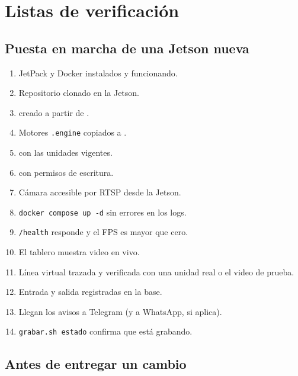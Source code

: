 \chapter{Listas de verificación}
\label{cap:checklist}

\section{Puesta en marcha de una Jetson nueva}

\begin{enumerate}
  \item[$\square$] JetPack y Docker instalados y funcionando.
  \item[$\square$] Repositorio clonado en la Jetson.
  \item[$\square$]  creado a partir de .
  \item[$\square$] Motores \texttt{.engine} copiados a .
  \item[$\square$]  con las unidades vigentes.
  \item[$\square$]  con permisos de escritura.
  \item[$\square$] Cámara accesible por RTSP desde la Jetson.
  \item[$\square$] \texttt{docker compose up -d} sin errores en los logs.
  \item[$\square$] \texttt{/health} responde y el FPS es mayor que cero.
  \item[$\square$] El tablero muestra video en vivo.
  \item[$\square$] Línea virtual trazada y verificada con una unidad real o el
        video de prueba.
  \item[$\square$] Entrada y salida registradas en la base.
  \item[$\square$] Llegan los avisos a Telegram (y a WhatsApp, si aplica).
  \item[$\square$] \texttt{grabar.sh estado} confirma que está grabando.
\end{enumerate}

\section{Antes de entregar un cambio}

